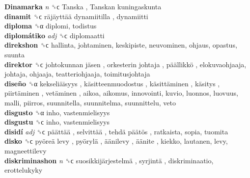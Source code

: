 \textbf{Dinamarka} \emph{n}  ␝ϲ   Tanska ,  Tanskan kuningaskunta   \\
\textbf{dinamit} ␝ϲ   räjäyttää dynamiitilla , dynamiitti  \\
\textbf{diploma} ␝α  diplomi, todistus  \\
\textbf{diplomátiko} \emph{adj}  ␝ϲ  diplomaatti  \\
\textbf{direkshon} ␝ϲ  hallinta, johtaminen, keskipiste, neuvominen, ohjaus, opastus, suunta  \\
\textbf{direktor} ␝ϲ   johtokunnan jäsen ,  orkesterin johtaja ,  päällikkö , elokuvaohjaaja, johtaja, ohjaaja, teatteriohjaaja, toimitusjohtaja  \\
\textbf{diseño} ␝α   kekseliäisyys ,  käsitteenmuodostus ,  käsittäminen ,  käsitys ,  piirtäminen ,  vetäminen , aikoa, aikomus, innovointi, kuvio, luonnos, luovuus, malli, piirros, suunnitella, suunnitelma, suunnittelu, veto  \\
\textbf{disgusto} ␝α  inho, vastenmielisyys  \\
\textbf{disgustu} ␝ϲ  inho, vastenmielisyys  \\
\textbf{disidí} \emph{adj}  ␝ϲ   päättää ,  selvittää ,  tehdä päätös , ratkaista, sopia, tuomita  \\
\textbf{disko} ␝ϲ   pyöreä levy ,  pyörylä ,  äänilevy ,  äänite , kiekko, lautanen, levy, magneettilevy  \\
\textbf{diskriminashon} \emph{n}  ␝ϲ   suosikkijärjestelmä ,  syrjintä , diskriminaatio, erottelukyky  \\
